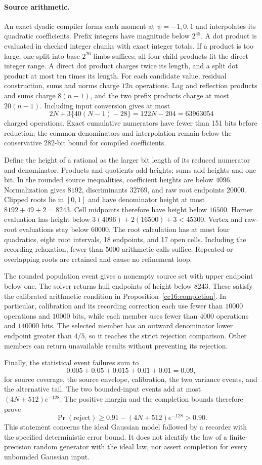 \paragraph{Source arithmetic.}
An exact dyadic compiler forms each moment at $\psi=-1,0,1$ and interpolates its quadratic coefficients. Prefix integers have magnitude below $2^{45}$. A dot product is evaluated in checked integer chunks with exact integer totals. If a product is too large, one split into base-$2^{26}$ limbs suffices; all four child products fit the direct integer range. A direct dot product charges twice its length, and a split dot product at most ten times its length. For each candidate value, residual construction, sums and norms charge $12n$ operations. Lag and reflection products and sums charge $8(n-1)$, and the two prefix products charge at most $20(n-1)$. Including input conversion gives at most
\[
 2N+3\{40(N-1)-28\}=122N-204=63963054
\]
charged operations. Exact cumulative numerators have fewer than 151 bits before reduction; the common denominators and interpolation remain below the conservative 282-bit bound for compiled coefficients.

Define the height of a rational as the larger bit length of its reduced numerator and denominator. Products and quotients add heights; sums add heights and one bit. In the rounded source inequalities, coefficient heights are below $4096$. Normalization gives $8192$, discriminants $32769$, and raw root endpoints $20000$. Clipped roots lie in $[0,1]$ and have denominator height at most $8192+49+2=8243$. Cell midpoints therefore have height below $16500$. Horner evaluation has height below $3(4096)+2(16500)+3<45300$. Vertex and raw-root evaluations stay below $60000$. The root calculation has at most four quadratics, eight root intervals, 18 endpoints, and 17 open cells. Including the recording relaxation, fewer than 5000 arithmetic calls suffice. Repeated or overlapping roots are retained and cause no refinement loop.

The rounded population event gives a nonempty source set with upper endpoint below one. The solver returns hull endpoints of height below 8243. These satisfy the calibrated arithmetic condition in Proposition~\ref{cc16:completion}. In particular, calibration and its recording correction each use fewer than $10000$ operations and $10000$ bits, while each member uses fewer than $4000$ operations and $140000$ bits. The selected member has an outward denominator lower endpoint greater than $4/5$, so it reaches the strict rejection comparison. Other members can return unavailable results without preventing its rejection.

Finally, the statistical event failures sum to
\[
 0.005+0.05+0.015+0.01+0.01=0.09,
\]
for source coverage, the source envelope, calibration, the two variance events, and the alternative tail. The two bounded-input events add at most $(4N+512)e^{-128}$. The positive margin and the completion bounds therefore prove
\[
 \Pr(\mathrm{reject})\ge0.91-(4N+512)e^{-128}>0.90.
\]
This statement concerns the ideal Gaussian model followed by a recorder with the specified deterministic error bound. It does not identify the law of a finite-precision random generator with the ideal law, nor assert completion for every unbounded Gaussian input.
